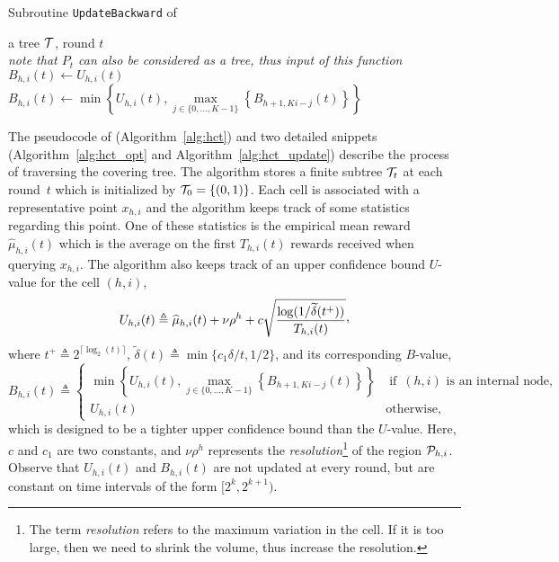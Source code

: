 \begin{algorithm}[ht]
\centering
\caption{Subroutine \texttt{UpdateBackward} of \HCT{}}
\label{alg:hct_update}
\begin{algorithmic}[1]
     a tree $\mathcal{T}$, round $t$ \\ \hfil \emph{note that $P_t$ can also be considered as a tree, thus input of this function}
            \State $B_{h,i}(t) \gets U_{h,i}(t)$
        \Else 
            \State $B_{h,i}(t) \gets \min\left\{U_{h,i}(t),\underset{j\in\{0,\ldots,K-1\}}{\max} \left\{B_{h+1,Ki-j}(t)\right\} \right\}$
        \EndIf
    \EndFor
\end{algorithmic}
\end{algorithm}

The pseudocode of \HCT (Algorithm~\ref{alg:hct}) and two detailed snippets (Algorithm~\ref{alg:hct_opt} and Algorithm~\ref{alg:hct_update}) describe the process of traversing the covering tree.
The algorithm stores a finite subtree $\mathcal{T}_t$ at each round~$t$ which is initialized by $\mathcal{T}_0 = \{(0,1)\}$. Each cell is associated with a representative point $x_{h,i}$ and the algorithm keeps track of some statistics regarding this point. One of these statistics is the empirical mean reward $\hat{\mu}_{h,i}(t)$ which is the average on the first $T_{h,i}(t)$ rewards received when querying $x_{h,i}$.
The \HCT algorithm also keeps track of an upper confidence bound $U$-value for the cell $(h,i)$,
\[
	U_{h,i}(t) \triangleq \hat{\mu}_{h,i}(t) + \nu\rho^{h} + c\sqrt{\frac{\operatorname{log}(1/\tilde{\delta}(t^+))}{T_{h,i}(t)}}\CommaBin
\]
where $t^+\triangleq2^{\lceil \operatorname{log}_2(t) \rceil}$, $\tilde{\delta}(t)\triangleq\min\{c_1\delta/t,1/2\}$, and its corresponding $B$-value,
\begin{equation*}
	B_{h,i}(t) \triangleq
	\left\{ \begin{array}{ll}
				\min\left\{U_{h,i}(t),\underset{j\in\{0,\ldots,K-1\}}{\max} \left\{B_{h+1,Ki-j}(t)\right\} \right\} & \operatorname{if}~(h,i) \text{ is an internal node,}\\
				U_{h,i}(t) & \operatorname{otherwise,}
			\end{array}\right.
\end{equation*}
which is designed to be a tighter upper confidence bound than the $U$-value. Here, $c$ and $c_1$ are two constants, and $\nu\rho^h$ represents the \emph{resolution}\footnote{The term \emph{resolution} refers to the maximum variation in the cell. If it is too large, then we need to shrink the volume, thus increase the resolution.} of the region $\mathcal{P}_{h,i}$. Observe that $U_{h,i}(t)$ and $B_{h,i}(t)$ are not updated at every round, but are constant on time intervals of the form $[2^k,2^{k+1})$.

